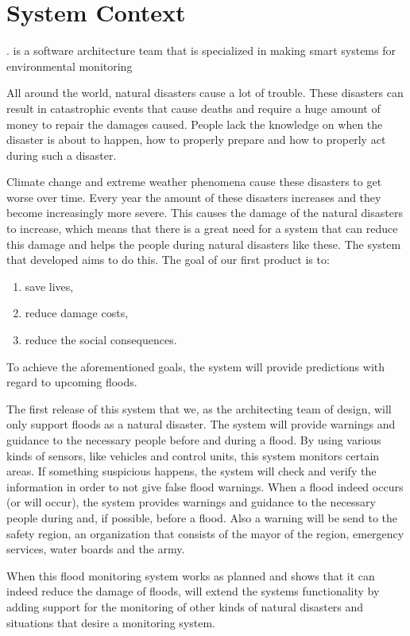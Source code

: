 \chapter{System Context}
\label{ch:context}

\CompanyName. is a software architecture team that is specialized in making smart systems for environmental monitoring

All around the world, natural disasters cause a lot of trouble. These disasters can result in catastrophic events that cause deaths and require a huge amount of money to repair the damages caused. People lack the knowledge on when the disaster is about to happen, how to properly prepare and how to properly act during such a disaster.

Climate change and extreme weather phenomena cause these disasters to get worse over time. Every year the amount of these disasters increases and they become increasingly more severe. This causes the damage of the natural disasters to increase, which means that there is a great need for a system that can reduce this damage and helps the people during natural disasters like these. The system that developed aims to do this.
The goal of our first product is to:
\begin{enumerate}
	\item save lives,
	\item reduce damage costs,
	\item reduce the social consequences.
\end{enumerate}

To achieve the aforementioned goals, the system will provide predictions with regard to upcoming floods.

The first release of this system that we, as the architecting team of \CompanyName design, will only support floods as a natural disaster. The system will provide warnings and guidance to the necessary people before and during a flood. By using various kinds of sensors, like vehicles and control units, this system monitors certain areas. If something suspicious happens, the system will check and verify the information in order to not give false flood warnings. When a flood indeed occurs (or will occur), the system   provides warnings and guidance to the necessary people during and, if possible, before a flood. Also a warning will be send to the safety region, an organization that consists of the mayor of the region, emergency services, water boards and the army. 

When this flood monitoring system works as planned and shows that it can indeed reduce the damage of floods, \CompanyName will extend the systems functionality  by adding support for the monitoring of other kinds of natural disasters and situations that desire a monitoring system.

